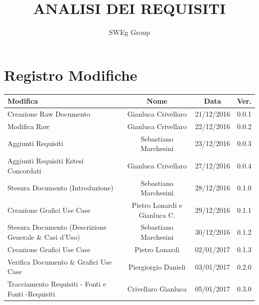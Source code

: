\documentclass[12pt,a4paper,titlepage]{article}
\begin{document}
	
	\title{ANALISI DEI REQUISITI}
	\author{SWEg Group}
	\date{}
	\maketitle
	
	\chead{}
	\cfoot{}
	\rfoot{\thepage}
	\renewcommand{\headrulewidth}{0.2pt}
	\renewcommand{\footrulewidth}{0.2pt}
	\section{Registro Modifiche}
	\small %
	
	{\renewcommand\arraystretch{1.2}  %
		\begin{tabular}{|l|c|c|c|}
			\hline
			{\textbf{Modifica}}&{\textbf{Nome}}&{\textbf{Data}}&{\textbf{Ver.}}\\
			\hline
			Creazione Raw Documento & Gianluca Crivellaro & 21/12/2016 & 0.0.1 \\
			\hline
			Modifica Raw & Gianluca Crivellaro & 22/12/2016 & 0.0.2 \\
			\hline
			Aggiunti Requisiti & Sebastiano Marchesini & 23/12/2016 & 0.0.3 \\
			\hline
			Aggiunti Requisiti Estesi Concordati & Gianluca Crivellaro & 27/12/2016 & 0.0.4 \\
			\hline
			Stesura Documento (Introduzione) & Sebastiano Marchesini &  28/12/2016 & 0.1.0 \\
			\hline
			Creazione Grafici Use Case & Pietro Lonardi e Gianluca C. & 29/12/2016 & 0.1.1 \\
			\hline
			Stesura Documento (Descrizione Generale \& Casi d'Uso) & Sebastiano Marchesini & 30/12/2016 & 0.1.2 \\
			\hline
			Creazione Grafici Use Case & Pietro Lonardi & 02/01/2017 & 0.1.3 \\
			\hline
			Verifica Documento \& Grafici Use Case & Piergiorgio Danieli & 03/01/2017 & 0.2.0 \\
			\hline
			Tracciamento Requisiti - Fonti e Fonti -Requisiti & Crivellaro Gianluca & 05/01/2017 & 0.3.0\\
			
			\hline
		\end{tabular}
	}	\normalsize
	\newpage
	\tableofcontents
	\thispagestyle{empty}
	
	\newpage
	
\end{document}
